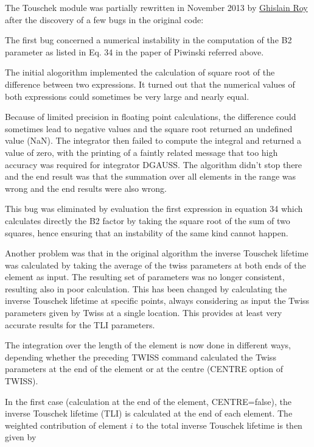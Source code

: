 The \madx Touschek module was partially rewritten in November 2013 by
\href{mailto:ghislain.roy@cern.ch}{Ghislain Roy}  
after the discovery of a few bugs in the original code:

The first bug concerned a numerical instability in the computation of
the B2 parameter as listed in Eq. 34 in the paper of Piwinski referred
above.  

The initial alogorithm implemented the calculation of square root of the
difference between two expressions. It turned out that the numerical
values of both expressions could sometimes be very large and nearly
equal.
  
Because of limited precision in floating point calculations, the
difference could sometimes lead to negative values  
and the square root returned an undefined value (NaN). 
The integrator then failed to compute the integral and returned a value
of zero, with the printing of a faintly related  
message that too high accuracy was required for integrator DGAUSS. 
The algorithm didn't stop there and the end result was that the
summation over all elements in the range was wrong 
and the end results were also wrong.

This bug was eliminated by evaluation the first expression in equation
34 which calculates directly the B2 factor by taking the square root of
the sum of two squares, hence ensuring that an instability of the same
kind cannot happen.  

Another problem was that in the original algorithm the inverse Touschek
lifetime was calculated by taking the average of the twiss parameters at
both ends of the element as input. The resulting set of parameters was
no longer consistent, resulting also in poor calculation. This has been
changed by calculating the inverse Touschek lifetime at specific points,  
always considering as input the Twiss parameters given by Twiss at a
single location. This provides at least very accurate results for the
TLI parameters. 

The integration over the length of the element is now done in different
ways, depending whether the preceding TWISS command calculated the Twiss
parameters at the end of the element or at the centre (CENTRE option of
TWISS).  

In the first case (calculation at the end of the element, CENTRE=false), 
the inverse Touschek lifetime (TLI) is calculated at the end of each
element. The weighted contribution of element $i$ to the total inverse
Touschek lifetime is then given by 


